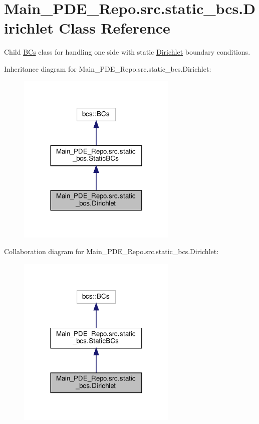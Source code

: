 \hypertarget{classMain__PDE__Repo_1_1src_1_1static__bcs_1_1Dirichlet}{}\section{Main\+\_\+\+P\+D\+E\+\_\+\+Repo.\+src.\+static\+\_\+bcs.\+Dirichlet Class Reference}
\label{classMain__PDE__Repo_1_1src_1_1static__bcs_1_1Dirichlet}


Child \hyperlink{namespaceMain__PDE__Repo_1_1src_1_1BCs}{B\+Cs} class for handling one side with static \hyperlink{classMain__PDE__Repo_1_1src_1_1static__bcs_1_1Dirichlet}{Dirichlet} boundary conditions.  




Inheritance diagram for Main\+\_\+\+P\+D\+E\+\_\+\+Repo.\+src.\+static\+\_\+bcs.\+Dirichlet\+:
\nopagebreak
\begin{figure}[H]
\begin{center}
\leavevmode
\includegraphics[width=216pt]{classMain__PDE__Repo_1_1src_1_1static__bcs_1_1Dirichlet__inherit__graph}
\end{center}
\end{figure}


Collaboration diagram for Main\+\_\+\+P\+D\+E\+\_\+\+Repo.\+src.\+static\+\_\+bcs.\+Dirichlet\+:
\nopagebreak
\begin{figure}[H]
\begin{center}
\leavevmode
\includegraphics[width=216pt]{classMain__PDE__Repo_1_1src_1_1static__bcs_1_1Dirichlet__coll__graph}
\end{center}
\end{figure}
